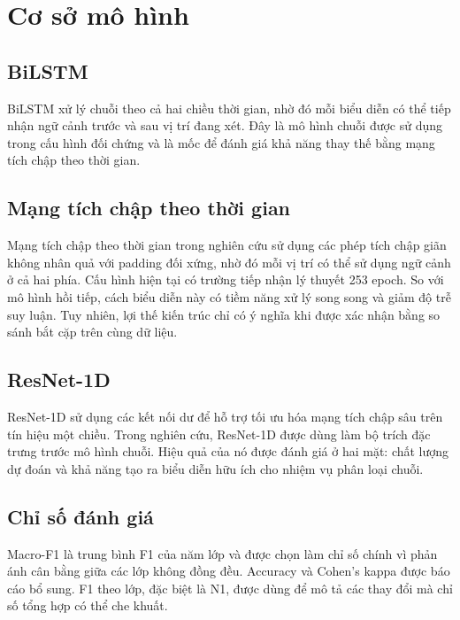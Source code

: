 \section{Cơ sở mô hình}
\label{sec:background}

\subsection{BiLSTM}

BiLSTM xử lý chuỗi theo cả hai chiều thời gian, nhờ đó mỗi biểu diễn có thể tiếp nhận ngữ cảnh trước và sau vị trí đang xét. Đây là mô hình chuỗi được sử dụng trong cấu hình đối chứng và là mốc để đánh giá khả năng thay thế bằng mạng tích chập theo thời gian.

\subsection{Mạng tích chập theo thời gian}

Mạng tích chập theo thời gian trong nghiên cứu sử dụng các phép tích chập giãn không nhân quả với padding đối xứng, nhờ đó mỗi vị trí có thể sử dụng ngữ cảnh ở cả hai phía. Cấu hình hiện tại có trường tiếp nhận lý thuyết 253 epoch. So với mô hình hồi tiếp, cách biểu diễn này có tiềm năng xử lý song song và giảm độ trễ suy luận. Tuy nhiên, lợi thế kiến trúc chỉ có ý nghĩa khi được xác nhận bằng so sánh bắt cặp trên cùng dữ liệu.

\subsection{ResNet-1D}

ResNet-1D sử dụng các kết nối dư để hỗ trợ tối ưu hóa mạng tích chập sâu trên tín hiệu một chiều. Trong nghiên cứu, ResNet-1D được dùng làm bộ trích đặc trưng trước mô hình chuỗi. Hiệu quả của nó được đánh giá ở hai mặt: chất lượng dự đoán và khả năng tạo ra biểu diễn hữu ích cho nhiệm vụ phân loại chuỗi.

\subsection{Chỉ số đánh giá}

Macro-F1 là trung bình F1 của năm lớp và được chọn làm chỉ số chính vì phản ánh cân bằng giữa các lớp không đồng đều. Accuracy và Cohen's kappa được báo cáo bổ sung. F1 theo lớp, đặc biệt là N1, được dùng để mô tả các thay đổi mà chỉ số tổng hợp có thể che khuất.
